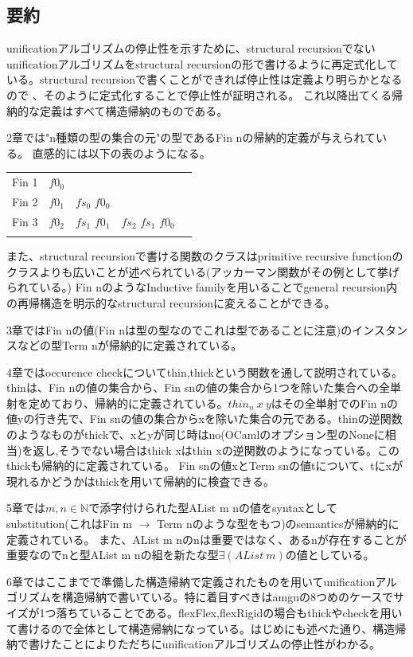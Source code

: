 \documentclass[11pt,a4paper]{jsarticle}
\begin{document}
\subsection*{要約}
unificationアルゴリズムの停止性を示すために、structural recursionでないunificationアルゴリズムをstructural recursionの形で書けるように再定式化している。structural recursionで書くことができれば停止性は定義より明らかとなるので
、そのように定式化することで停止性が証明される。
これ以降出てくる帰納的な定義はすべて構造帰納のものである。\par
2章では"n種類の型の集合の元"の型であるFin nの帰納的定義が与えられている。
直感的には以下の表のようになる。
\begin{table}[h]
\begin{tabular}{lllll}
\multicolumn{1}{l|}{Fin 1} & $f0_0$ &             &                   &  \\
\multicolumn{1}{l|}{Fin 2} & $f0_1$ & $fs_0$ $f0_0$ &                   &  \\
\multicolumn{1}{l|}{Fin 3} & $f0_2$ & $fs_1$ $f0_1$ & $fs_2$ $fs_1$ $f0_0$ &  \\
                           &       &             &                   & 
\end{tabular}
\end{table}
また、structural recursionで書ける関数のクラスはprimitive recursive functionのクラスよりも広いことが述べられている(アッカーマン関数がその例として挙げられている。)
Fin nのようなInductive familyを用いることでgeneral recursion内の再帰構造を明示的なstructural recursionに変えることができる。\par
3章ではFin nの値(Fin nは型の型なのでこれは型であることに注意)のインスタンスなどの型Term nが帰納的に定義されている。\par
4章ではoccurence checkについてthin,thickという関数を通して説明されている。
thinは、Fin nの値の集合から、Fin snの値の集合から1つを除いた集合への全単射を定めており、帰納的に定義されている。$thin_n\ x\ y$はその全単射でのFin nの値yの行き先で、Fin snの値の集合からxを除いた集合の元である。thinの逆関数のようなものがthickで、xとyが同じ時はno(OCamlのオプション型のNoneに相当)を返し,そうでない場合はthick xはthin xの逆関数のようになっている。このthickも帰納的に定義されている。
Fin snの値xとTerm snの値tについて、tにxが現れるかどうかはthickを用いて帰納的に検査できる。\par
5章では$m,n\in \mathbb{N}$で添字付けられた型AList m nの値をsyntaxとしてsubstitution(これはFin m $\rightarrow$ Term nのような型をもつ)のsemanticsが帰納的に定義されている。
また、AList m nのnは重要ではなく、あるnが存在することが重要なのでnと型AList m nの組を新たな型$\exists (AList\ m)$の値としている。\par
6章ではここまでで準備した構造帰納で定義されたものを用いてunificationアルゴリズムを構造帰納で書いている。特に着目すべきはamguの8つめのケースでサイズが1つ落ちていることである。flexFlex,flexRigidの場合もthickやcheckを用いて書けるので全体として構造帰納になっている。はじめにも述べた通り、構造帰納で書けたことによりただちにunificationアルゴリズムの停止性がわかる。
\end{document}
